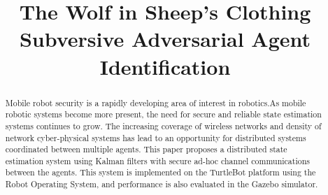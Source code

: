 \documentclass[conference]{IEEEtran}
\begin{document}
%
\title{The Wolf in Sheep's Clothing\\
Subversive Adversarial Agent Identification}


\author{
}



\maketitle

\begin{abstract}
Mobile robot security is a rapidly developing area of interest in robotics.As mobile robotic systems become more present, the need for secure and reliable state estimation systems continues to grow. The increasing coverage of wireless networks and density of network cyber-physical systems has lead to an opportunity for distributed systems coordinated between multiple agents. This paper proposes a distributed state estimation system using Kalman filters with secure ad-hoc channel communications between the agents. This system is implemented on the TurtleBot platform using the Robot Operating System, and performance is also evaluated in the Gazebo simulator.
\end{abstract}
\end{document}
